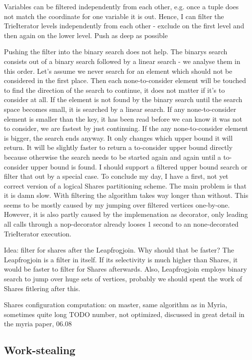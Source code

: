 Variables can be filtered independently from each other, e.g. once a tuple does not match the coordinate for one variable it is out. Hence, I can filter the TrieIterator levels independently from each other - exclude on the first level and then again on the lower level.
Push as deep as possible

Pushing the filter into the binary search does not help. The binarys search consists out of a binary search followed by a linear search - we analyse them in this order. Let’s assume we never search for an element which should not be considered in the first place. Then each none-to-consider element will be touched to find the direction of the search to continue, it does not matter if it’s to consider at all.
If the element is not found by the binary search until the search space becomes small, it is searched by a linear search. If any none-to-consider element is smaller than the key, it has been read before we can know it was not to consider, we are fastest by just continuing. If the any none-to-consider element is bigger, the search ends anyway. It only changes which upper bound it will return. It will be slightly faster to return a to-consider upper bound directly because otherwise the search needs to be started again and again until a to-consider upper bound is found. I should support a filtered upper bound search or filter that out by a special case.
To conclude my day, I have a first, not yet correct version of a logical Shares partitioning scheme. The main problem is that it is damn slow. With filtering the algorithm takes way longer than without. This seems to be mostly caused by my jumping over filtered vertices one-by-one. However, it is also partly caused by the implemenation as decorator, only leading all calls through a nop-decorator already looses 1 second to an none-decorated TrieIterator execution.

Idea: filter for shares after the Leapfrogjoin. Why should that be faster? The Leapfrogjoin is a filter in itself. If its selectivity is much higher than Shares, it would be faster to filter for Shares afterwards. Also, Leapfrogjoin employs binary search to jump over huge sets of vertices, probably we should spent the work of Shares fitlering after this.


Shares configuration computation: on master, same algorithm as in Myria, sometimes quite long TODO number, not optimized,
discussed in great detail in the myria paper, 06.08


\subsection{Work-stealing} \label{ssec:work-stealing}
